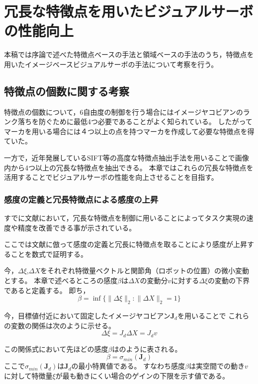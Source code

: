 \documentclass[fleqn]{jreport}
\begin{document}
\chapter{冗長な特徴点を用いたビジュアルサーボの性能向上}\label{Sencitivity}
本稿では序論で述べた特徴点ベースの手法と領域ベースの手法のうち，特徴点を用いたイメージベースビジュアルサーボの手法について考察を行う。

\section{特徴点の個数に関する考察}
特徴点の個数について，6自由度の制御を行う場合にはイメージヤコビアンのランク落ちを防ぐために最低4つ必要であることがよく知られている\cite{Chaumette2006}。
したがってマーカを用いる場合には４つ以上の点を持つマーカを作成して必要な特徴点を得ていた。

一方で，近年発展しているSIFT\cite{Lowe1999}等の高度な特徴点抽出手法を用いることで画像内から4つ以上の冗長な特徴点を抽出できる。
本章ではこれらの冗長な特徴点を活用することでビジュアルサーボの性能を向上させることを目指す。


\subsection{感度の定義と冗長特徴点による感度の上昇 }
すでに文献\cite{Hashimoto1998}において，冗長な特徴点を制御に用いることによってタスク実現の速度や精度を改善できる事が示されている。

ここでは文献に倣って感度の定義と冗長に特徴点を取ることにより感度が上昇することを数式で証明する。

今，$\Delta \xi$,$\Delta X$をそれぞれ特徴量ベクトルと関節角（ロボットの位置）の微小変動とする。
本章で述べるところの感度$\beta$は$\Delta X$の変動分$v$に対する$\Delta \xi$の変動の下界であると定義する。
即ち，
\begin{equation}
	\beta=\inf\{ \| \Delta\xi \|_2:\| \Delta X \|_2=1 \}
	\label{eq:beta_def}
\end{equation}

今，目標値付近において固定したイメージヤコビアン$\bm{J}_d$を用いることで
これらの変数の関係は次のように示せる。
\begin{equation}
	\Delta \xi = J_d \Delta X = J_d v
	\label{eq:Jacob}
\end{equation}

この関係式において先ほどの感度$\beta$はのように表される。
\begin{equation}
	\beta = \sigma_{min}(\bm{J}_d)
	\label{eq:beta_jacob}
\end{equation}
ここで$\sigma_{min}(\bm{J}_d)$は$\bm{J}_d$の最小特異値である。
すなわち感度$\beta$は実空間での動き$v$に対して特徴量$\xi$が最も動きにくい場合のゲインの下限を示す値である。
\end{document}
